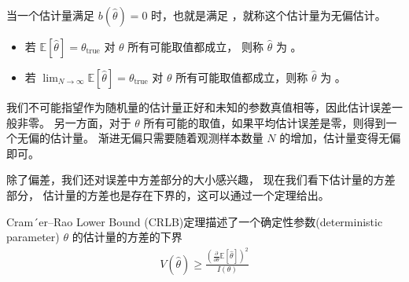 \documentclass[letterpaper,10pt,english]{sphinxmanual}
\begin{document}
\begin{sphinxShadowBox}

当一个估计量满足 \(b(\hat{\theta})=0\) 时，也就是满足  ，就称这个估计量为无偏估计。
\begin{itemize}
\item {} 
若 \(\mathbb{E}[\hat{\theta}]=\theta_{\text{true}}\) 对 \(\theta\) 所有可能取值都成立，
则称 \(\hat{\theta}\) 为 。

\item {} 
若 \(\lim_{N \rightarrow \infty} \mathbb{E}[\hat{\theta}]=\theta_{\text{true}}\)
对 \(\theta\) 所有可能取值都成立，则称 \(\hat{\theta}\) 为 。

\end{itemize}
\end{sphinxShadowBox}

我们不可能指望作为随机量的估计量正好和未知的参数真值相等，因此估计误差一般非零。
另一方面，对于 \(\theta\) 所有可能的取值，如果平均估计误差是零，则得到一个无偏的估计量。
渐进无偏只需要随着观测样本数量 \(N\) 的增加，估计量变得无偏即可。

除了偏差，我们还对误差中方差部分的大小感兴趣，
现在我们看下估计量的方差部分，
估计量的方差也是存在下界的，这可以通过一个定理给出。

\begin{sphinxShadowBox}

Cram´er–Rao Lower Bound (CRLB)定理描述了一个确定性参数(deterministic parameter) \(\theta\)
的估计量的方差的下界
\begin{equation}\label{equation:推断与检验/content:eq_2_50}
\begin{split}V(\hat{\theta}) \ge \frac{(\frac{\partial}{\partial \theta} \mathbb{E}[\hat{\theta}] )^2}{I(\theta)}\end{split}
\end{equation}\end{sphinxShadowBox}
\end{document}
